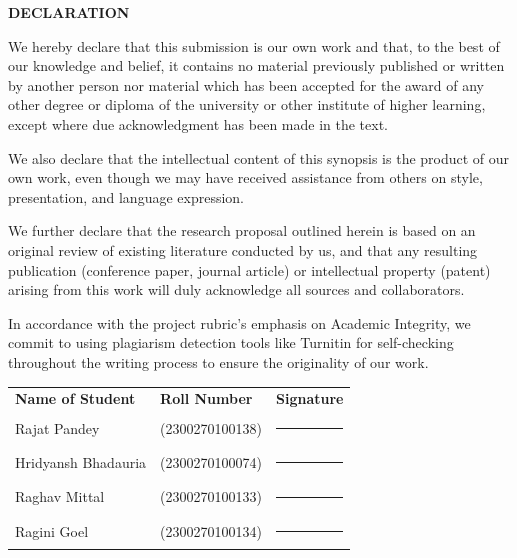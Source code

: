 \documentclass[12pt,a4paper]{article}
\begin{document}
\newpage
\pagestyle{fancy}
\setcounter{page}{1}

\begin{center}
  {\large\bfseries DECLARATION}
\end{center}

\vspace{0.5cm}

We hereby declare that this submission is our own work and that, to the best of our
knowledge and belief, it contains no material previously published or written by another
person nor material which has been accepted for the award of any other degree or diploma
of the university or other institute of higher learning, except where due acknowledgment
has been made in the text.

We also declare that the intellectual content of this synopsis is the product of our own
work, even though we may have received assistance from others on style, presentation, and
language expression.

We further declare that the research proposal outlined herein is based on an original review
of existing literature conducted by us, and that any resulting publication (conference
paper, journal article) or intellectual property (patent) arising from this work will duly
acknowledge all sources and collaborators.

In accordance with the project rubric's emphasis on Academic Integrity, we commit to
using plagiarism detection tools like Turnitin for self-checking throughout the writing
process to ensure the originality of our work.

\vspace{1.2cm}

\begin{tabular}{p{4.5cm} p{4cm} p{3.5cm}}
  \textbf{Name of Student}    & \textbf{Roll Number}   & \textbf{Signature} \\[10pt]
  Rajat Pandey                & (2300270100138)        & \rule{3cm}{0.4pt} \\[10pt]
  Hridyansh Bhadauria         & (2300270100074)        & \rule{3cm}{0.4pt} \\[10pt]
  Raghav Mittal               & (2300270100133)        & \rule{3cm}{0.4pt} \\[10pt]
  Ragini Goel                 & (2300270100134)        & \rule{3cm}{0.4pt} \\
\end{tabular}

\vspace{1.5cm}
\end{document}
